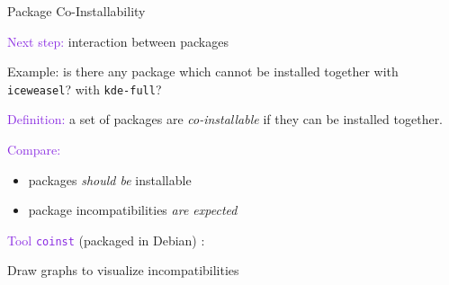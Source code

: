 \documentclass[xcolor={dvipsnames}]{beamer}
\newcommand{\EEE}[1]{\textcolor{BlueViolet}{#1}}
\begin{document}
\begin{frame}[fragile]{Package Co-Installability}

\EEE{Next step:} interaction between packages

\hspace{1cm}\begin{minipage}{\dimexpr\textwidth-2.5cm}
\vspace{0.3em}
Example: is there any package which cannot be installed together with
\texttt{iceweasel}? with \texttt{kde-full}?
\end{minipage}

\vspace{1.5em}

\EEE{Definition:} a set of packages are \emph{co-installable} if they
can be installed together.

\vspace{1.5em}

\EEE{Compare:}
\begin{itemize}
\item packages \emph{should be} installable
\item package incompatibilities \emph{are expected}
\end{itemize}

\vspace{1.5em}

\EEE{Tool \texttt{coinst}} (packaged in Debian) :

\hspace{1cm} Draw graphs to visualize incompatibilities

\end{frame}
\end{document}
